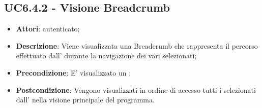 \subsection{UC6.4.2 - Visione Breadcrumb}
\label{ssec:UC6.4.2}
\begin{itemize}
\item \textbf{Attori}:  autenticato;
\item \textbf{Descrizione}: Viene visualizzata una Breadcrumb che rappresenta il percorso effettuato dall' durante la navigazione dei vari  selezionati;
\item \textbf{Precondizione}: E' visualizzato un ;
\item \textbf{Postcondizione}: Vengono visualizzati in ordine di accesso tutti i  selezionati dall' nella visione principale del programma.
\end{itemize}

